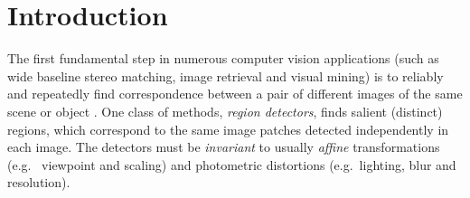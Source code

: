 \documentclass[conference,compsoc]{IEEEtran}
\begin{document}




%
\IEEEpeerreviewmaketitle


\section{Introduction}
\label{sec:intro}
The first fundamental step in numerous computer vision applications (such as wide baseline stereo matching, image retrieval and visual mining) is to reliably and repeatedly find correspondence between a pair of different images of the same scene or object \cite{Matas2002BMVC, Rodriguez2013, EscaleraCVPR07}. One class of methods, {\em region detectors}, finds salient (distinct) regions, which correspond to the same image patches detected independently in each image. The detectors must be {\em invariant} to usually {\em affine} transformations (e.g.~ viewpoint and scaling) and photometric distortions (e.g.~lighting, blur and resolution). 
\end{document}
